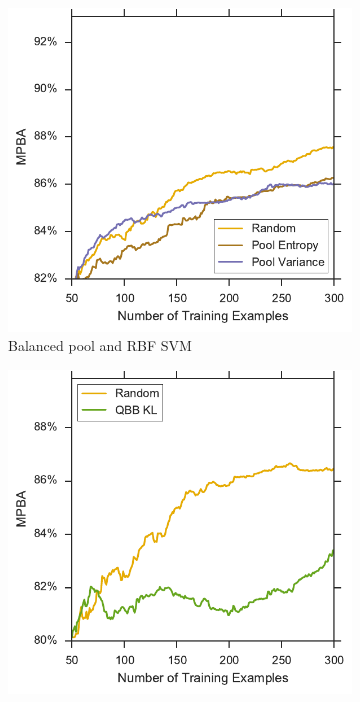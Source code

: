 \begin{figure}[p]
\begin{subfigure}{.5\textwidth}
		\includegraphics[width=\linewidth]{figures/5_active/sdss_br_ind_lower}
		\caption{Balanced pool and RBF SVM}
		\label{fig:sdss_br_ind_lower}
	\end{subfigure}
	\begin{subfigure}{.5\textwidth}
		\centering
		\includegraphics[width=\textwidth]{figures/5_active/sdss_ul_ind_lower}

\end{subfigure}
\end{figure}
